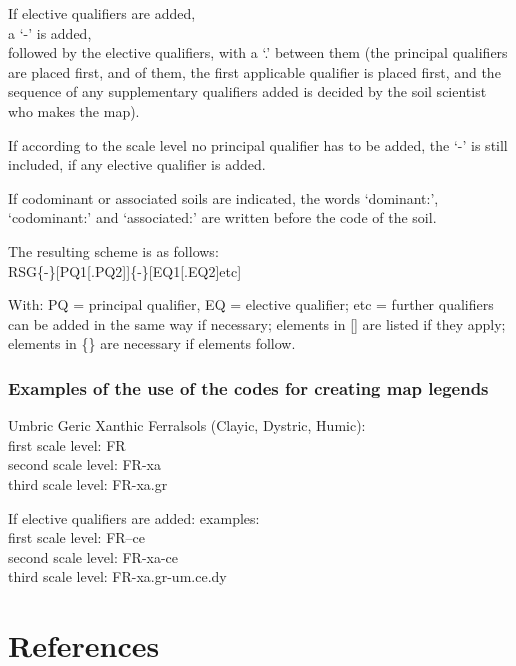 \documentclass[
  letterpaper,
  DIV=11,
  numbers=noendperiod]{scrreprt}
\begin{document}
If elective qualifiers are added,\\
a `-' is added,\\
followed by the elective qualifiers, with a `.' between them (the
principal qualifiers are placed first, and of them, the first applicable
qualifier is placed first, and the sequence of any supplementary
qualifiers added is decided by the soil scientist who makes the map).

If according to the scale level no principal qualifier has to be added,
the `-' is still included, if any elective qualifier is added.

If codominant or associated soils are indicated, the words `dominant:',
`codominant:' and `associated:' are written before the code of the soil.

The resulting scheme is as follows:\\
RSG\{-\}{[}PQ1{[}.PQ2{]}{]}\{-\}{[}EQ1{[}.EQ2{]}etc{]}

With: PQ = principal qualifier, EQ = elective qualifier; etc = further
qualifiers can be added in the same way if necessary; elements in {[}{]}
are listed if they apply; elements in \{\} are necessary if elements
follow.

\hypertarget{examples-of-the-use-of-the-codes-for-creating-map-legends}{%
\subsection{Examples of the use of the codes for creating map
legends}\label{examples-of-the-use-of-the-codes-for-creating-map-legends}}

Umbric Geric Xanthic Ferralsols (Clayic, Dystric, Humic):\\
first scale level: FR\\
second scale level: FR-xa\\
third scale level: FR-xa.gr

If elective qualifiers are added: examples:\\
first scale level: FR--ce\\
second scale level: FR-xa-ce\\
third scale level: FR-xa.gr-um.ce.dy


\hypertarget{references}{%
\chapter{References}\label{references}}
\end{document}
